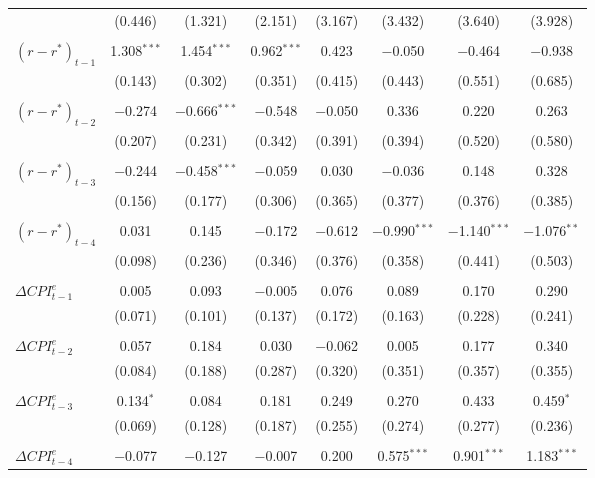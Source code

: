\documentclass[11pt]{article}
\begin{document}
\begin{table}[!htbp]
\begin{threeparttable}
\begin{tabular}{@{\extracolsep{3pt}}lccccccc}
    & (0.446) & (1.321) & (2.151) & (3.167) & (3.432) & (3.640) & (3.928) \\ 
      & & & & & & & \\ 
      $\left(r-r^*\right)_{t-1}$ & 1.308$^{***}$ & 1.454$^{***}$ & 0.962$^{***}$ & 0.423 & $-$0.050 & $-$0.464 & $-$0.938 \\ 
      & (0.143) & (0.302) & (0.351) & (0.415) & (0.443) & (0.551) & (0.685) \\ 
      & & & & & & & \\ 
      $\left(r-r^*\right)_{t-2}$ & $-$0.274 & $-$0.666$^{***}$ & $-$0.548 & $-$0.050 & 0.336 & 0.220 & 0.263 \\ 
      & (0.207) & (0.231) & (0.342) & (0.391) & (0.394) & (0.520) & (0.580) \\ 
      & & & & & & & \\ 
      $\left(r-r^*\right)_{t-3}$ & $-$0.244 & $-$0.458$^{***}$ & $-$0.059 & 0.030 & $-$0.036 & 0.148 & 0.328 \\ 
      & (0.156) & (0.177) & (0.306) & (0.365) & (0.377) & (0.376) & (0.385) \\ 
      & & & & & & & \\ 
      $\left(r-r^*\right)_{t-4}$ & 0.031 & 0.145 & $-$0.172 & $-$0.612 & $-$0.990$^{***}$ & $-$1.140$^{***}$ & $-$1.076$^{**}$ \\ 
      & (0.098) & (0.236) & (0.346) & (0.376) & (0.358) & (0.441) & (0.503) \\ 
      & & & & & & & \\ 
    $\Delta\mathit{CPI}_{t-1}^e$ & 0.005 & 0.093 & $-$0.005 & 0.076 & 0.089 & 0.170 & 0.290 \\ 
    & (0.071) & (0.101) & (0.137) & (0.172) & (0.163) & (0.228) & (0.241) \\ 
      & & & & & & & \\ 
      $\Delta\mathit{CPI}_{t-2}^e$ & 0.057 & 0.184 & 0.030 & $-$0.062 & 0.005 & 0.177 & 0.340 \\ 
      & (0.084) & (0.188) & (0.287) & (0.320) & (0.351) & (0.357) & (0.355) \\ 
      & & & & & & & \\ 
      $\Delta\mathit{CPI}_{t-3}^e$ & 0.134$^{*}$ & 0.084 & 0.181 & 0.249 & 0.270 & 0.433 & 0.459$^{*}$ \\ 
      & (0.069) & (0.128) & (0.187) & (0.255) & (0.274) & (0.277) & (0.236) \\ 
      & & & & & & & \\ 
      $\Delta\mathit{CPI}_{t-4}^e$ & $-$0.077 & $-$0.127 & $-$0.007 & 0.200 & 0.575$^{***}$ & 0.901$^{***}$ & 1.183$^{***}$ \\ 

\end{tabular}
\end{threeparttable}
\end{table}
\end{document}
